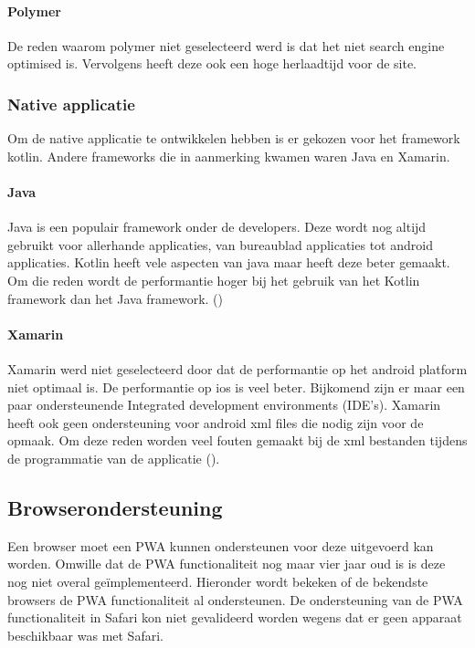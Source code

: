 \paragraph{Polymer}
De reden waarom polymer niet geselecteerd werd is dat het niet search engine optimised is. Vervolgens heeft deze ook een hoge herlaadtijd voor de site.

\subsubsection{Native applicatie}
Om de native applicatie te ontwikkelen hebben is er gekozen voor het framework kotlin. Andere frameworks die in aanmerking kwamen waren Java en Xamarin.

\paragraph{Java}
Java is een populair framework onder de developers. Deze wordt nog altijd gebruikt voor allerhande applicaties, van bureaublad applicaties tot android applicaties. Kotlin heeft vele aspecten van java maar heeft deze beter gemaakt. Om die reden wordt de performantie hoger bij het gebruik van het Kotlin framework dan het Java framework. (\cite{KOTLIN_VS_JAVA})

\paragraph{Xamarin}
Xamarin werd niet geselecteerd door dat de performantie op het android platform niet optimaal is. De performantie op ios is veel beter. Bijkomend zijn er maar een paar ondersteunende Integrated development environments (IDE’s). Xamarin heeft ook geen ondersteuning voor android xml files die nodig zijn voor de opmaak. Om deze reden worden veel fouten gemaakt bij de xml bestanden tijdens de programmatie van de applicatie (\cite{KOTIN_VS_XAMARIN}).


\subsection{Browserondersteuning}
Een browser moet een PWA kunnen ondersteunen voor deze uitgevoerd kan worden. Omwille dat de PWA functionaliteit nog maar vier jaar oud is is deze nog niet overal geïmplementeerd. Hieronder wordt bekeken of de bekendste browsers de PWA functionaliteit al ondersteunen. De ondersteuning van de PWA functionaliteit in Safari kon niet gevalideerd worden wegens dat er geen apparaat beschikbaar was met Safari.

